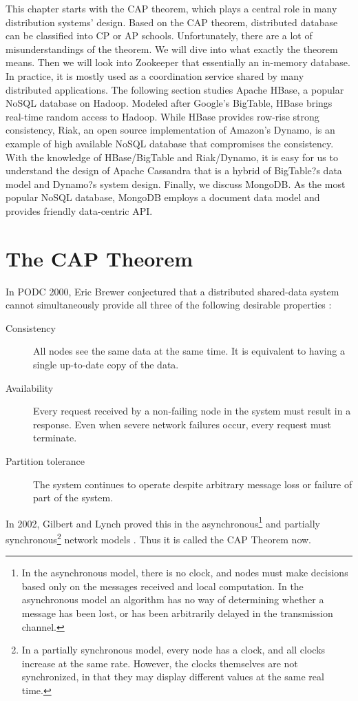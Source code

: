 \documentclass[11pt]{book}
\begin{document}
This chapter starts with the CAP theorem, which plays a central role in many distribution systems' design. Based on the CAP theorem, distributed database can be classified into CP or AP schools. Unfortunately, there are a lot of misunderstandings of the theorem. We will dive into what exactly the theorem means. Then we will look into Zookeeper that essentially an in-memory database. In practice, it is mostly used as a coordination service shared by many distributed applications. The following section studies Apache HBase, a popular NoSQL database on Hadoop. Modeled after Google's BigTable, HBase brings real-time random access to Hadoop. While HBase provides row-rise strong consistency, Riak, an open source implementation of Amazon's Dynamo, is an example of high available NoSQL database that compromises the consistency. With the knowledge of HBase/BigTable and Riak/Dynamo, it is easy for us to understand the design of Apache Cassandra that is a hybrid of BigTable?s data model and Dynamo?s system design. Finally, we discuss MongoDB. As the most popular NoSQL database, MongoDB employs a document data model and provides friendly data-centric API.

\section[The CAP Theorem]
{The CAP Theorem} \label{sec:cap}
In PODC 2000, Eric Brewer conjectured that a distributed shared-data system cannot simultaneously provide all three of the following desirable properties \cite{Brewer:2000:TRD}:
\begin{description}
\item[Consistency] All nodes see the same data at the same time. It is equivalent to having a single up-to-date copy of the data.
\item[Availability] Every request received by a non-failing node in the system must result in a response. Even when severe network failures occur, every request must terminate.
\item[Partition tolerance] The system continues to operate despite arbitrary message loss or failure of part of the system.
\end{description}
In 2002, Gilbert and Lynch proved this in the asynchronous\footnote{In the asynchronous model, there is no clock, and nodes must make decisions based only on the messages received and local computation. In the asynchronous model an algorithm has no way of determining whether a message has been lost, or has been arbitrarily delayed in the transmission channel.} and partially synchronous\footnote{In a partially synchronous model, every node has a clock, and all clocks increase at the same rate. However, the clocks themselves are not synchronized, in that they may display different values at the same real time.} network models \cite{Gilbert:2002:BCF}. Thus it is called the CAP Theorem now.
\end{document}
